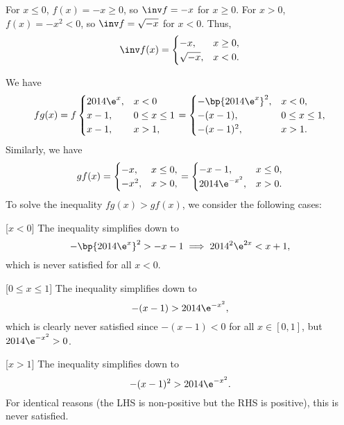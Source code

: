 \begin{solution}
    \begin{ppart}
        For $x \leq 0$, $f(x) = -x \geq 0$, so $\inv f = -x$ for $x \geq 0$. For $x > 0$, $f(x) = -x^2 < 0$, so $\inv f = \sqrt{-x}$ for $x < 0$. Thus, \[\inv f(x)= \begin{cases}-x , & x \geq 0, \\ \sqrt{-x} , & x < 0.\end{cases}\]
    \end{ppart}
    \begin{ppart}
        We have \[fg(x) = f\begin{cases}2014 \e^x, & x< 0 \\ x-1 , & 0 \leq  x \leq 1 \\ x-1, & x > 1,\end{cases} = \begin{cases}-\bp{2014\e^x}^2 , & x < 0, \\ -(x-1), & 0 \leq x \leq 1, \\ -(x-1)^2, & x > 1.\end{cases}\] Similarly, we have \[gf(x) = \begin{cases}-x, & x \leq 0, \\ -x^2, & x > 0,\end{cases} = \begin{cases}-x - 1, & x \leq 0, \\ 2014 \e^{-x^2}, & x > 0.\end{cases}\] To solve the inequality $fg(x) > gf(x)$, we consider the following cases:

        [$x < 0$] The inequality simplifies down to \[-\bp{2014\e^x}^2 > -x -1 \implies 2014^2 \e^{2x} < x + 1,\] which is never satisfied for all $x < 0$.

        [$0 \leq x \leq 1$] The inequality simplifies down to \[-(x-1) > 2014\e^{-x^2},\] which is clearly never satisfied since $-(x-1) < 0$ for all $x \in [0, 1]$, but $2014 \e^{-x^2} > 0$.

        [$x > 1$] The inequality simplifies down to \[-(x-1)^2 > 2014\e^{-x^2}.\] For identical reasons (the LHS is non-positive but the RHS is positive), this is never satisfied.


\end{ppart}
\end{solution}
